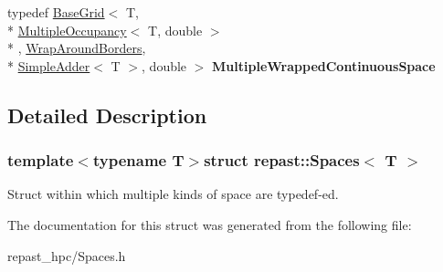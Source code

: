 \begin{DoxyCompactItemize}
\item 
\hypertarget{structrepast_1_1_spaces_a6856d5584ad2ddb01c01f75217903722}{typedef \hyperlink{classrepast_1_1_base_grid}{Base\-Grid}$<$ T, \\*
\hyperlink{classrepast_1_1_multiple_occupancy}{Multiple\-Occupancy}$<$ T, double $>$\\*
, \hyperlink{classrepast_1_1_wrap_around_borders}{Wrap\-Around\-Borders}, \\*
\hyperlink{classrepast_1_1_simple_adder}{Simple\-Adder}$<$ T $>$, double $>$ {\bfseries Multiple\-Wrapped\-Continuous\-Space}}\label{structrepast_1_1_spaces_a6856d5584ad2ddb01c01f75217903722}

\end{DoxyCompactItemize}


\subsection{Detailed Description}
\subsubsection*{template$<$typename T$>$struct repast\-::\-Spaces$<$ T $>$}

Struct within which multiple kinds of space are typedef-\/ed. 

The documentation for this struct was generated from the following file\-:\begin{DoxyCompactItemize}
\item 
repast\-\_\-hpc/Spaces.\-h\end{DoxyCompactItemize}
